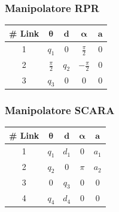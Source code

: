 ﻿\documentclass[11pt, a4paper]{article}
\begin{document}
\begin{minipage}[t]{0.48\textwidth}
    \subsubsection*{Manipolatore RPR}
    \centering
    \begin{tabular}{|c|c|c|c|c|}
        \hline
        \textbf{\# Link} & \(\boldsymbol{\theta}\) & \(\boldsymbol{d}\) & \(\boldsymbol{\alpha}\) & \(\boldsymbol{a}\) \\
        \hline
        1 & \(q_{1}\) & 0 & \(\frac{\pi}{2}\) & 0\\
        \hline
        2 & \(\frac{\pi}{2}\) & \(q_{2}\) & \(-\frac{\pi}{2}\) & 0\\
        \hline
        3 & \(q_{3}\) & 0 & 0 & 0\\
        \hline
    \end{tabular}
\end{minipage}
\hfill
\begin{minipage}[t]{0.48\textwidth}
    \subsubsection*{Manipolatore SCARA}
    \centering
    \begin{tabular}{|c|c|c|c|c|}
        \hline
        \textbf{\# Link} & \(\boldsymbol{\theta}\) & \(\boldsymbol{d}\) & \(\boldsymbol{\alpha}\) & \(\boldsymbol{a}\) \\
        \hline
        1 & \(q_{1}\) & \(d_{1}\) & 0 & \(a_{1}\) \\
        \hline
        2 & \(q_{2}\) & 0 & \(\pi\) & \(a_{2}\) \\
        \hline
        3 & 0 & \(q_{3}\) & 0 & 0 \\
        \hline
        4 & \(q_{4}\) & \(d_{4}\) & 0 & 0 \\
        \hline
    \end{tabular}

\end{minipage}

\vspace{1cm} %
\end{document}
